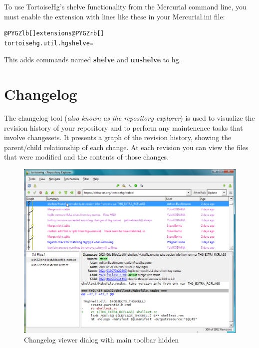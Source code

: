 \documentclass[letterpaper,10pt,english]{manual}
\begin{document}
To use TortoiseHg's shelve functionality from the Mercurial command
line, you must enable the extension with lines like these in your
Mercurial.ini file:

\begin{Verbatim}[commandchars=@\[\]]
@PYGZlb[]extensions@PYGZrb[]
tortoisehg.util.hgshelve=
\end{Verbatim}

This adds commands named \textbf{shelve} and \textbf{unshelve} to hg.

\resetcurrentobjects
\hypertarget{--doc-changelog}{}

\section{Changelog}
\hypertarget{module-changelog.dialog}{}
The changelog tool (\emph{also known as the repository explorer}) is
used to visualize the revision history of your repository and to perform
any maintenence tasks that involve changesets. It presents a graph of
the revision history, showing the parent/child relationship of each
change. At each revision you can view the files that were modified and
the contents of those changes.
\begin{figure}[htbp]
\centering

\includegraphics{log.png}
\caption{Changelog viewer dialog with main toolbar hidden}\end{figure}
\end{document}
